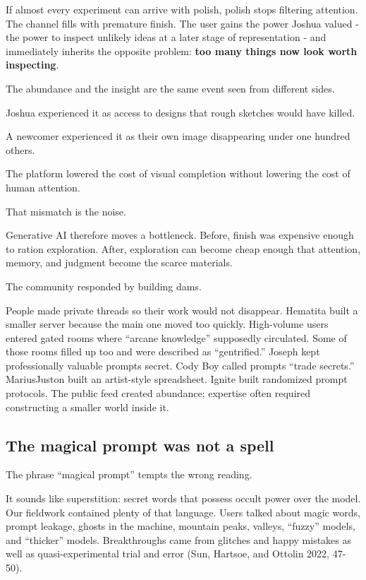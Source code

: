 \documentclass[
]{article}
\begin{document}
If almost every experiment can arrive with polish, polish stops
filtering attention. The channel fills with premature finish. The user
gains the power Joshua valued - the power to inspect unlikely ideas at a
later stage of representation - and immediately inherits the opposite
problem: \textbf{too many things now look worth inspecting}.

The abundance and the insight are the same event seen from different
sides.

Joshua experienced it as access to designs that rough sketches would
have killed.

A newcomer experienced it as their own image disappearing under one
hundred others.

The platform lowered the cost of visual completion without lowering the
cost of human attention.

That mismatch is the noise.

Generative AI therefore moves a bottleneck. Before, finish was expensive
enough to ration exploration. After, exploration can become cheap enough
that attention, memory, and judgment become the scarce materials.

The community responded by building dams.

People made private threads so their work would not disappear. Hematita
built a smaller server because the main one moved too quickly.
High-volume users entered gated rooms where ``arcane knowledge''
supposedly circulated. Some of those rooms filled up too and were
described as ``gentrified.'' Joseph kept professionally valuable prompts
secret. Cody Boy called prompts ``trade secrets.'' MariusJuston built an
artist-style spreadsheet. Ignite built randomized prompt protocols. The
public feed created abundance; expertise often required constructing a
smaller world inside it.

\subsection{The magical prompt was not a
spell}\label{the-magical-prompt-was-not-a-spell}

The phrase ``magical prompt'' tempts the wrong reading.

It sounds like superstition: secret words that possess occult power over
the model. Our fieldwork contained plenty of that language. Users talked
about magic words, prompt leakage, ghosts in the machine, mountain
peaks, valleys, ``fuzzy'' models, and ``thicker'' models. Breakthroughs
came from glitches and happy mistakes as well as quasi-experimental
trial and error (Sun, Hartsoe, and Ottolin 2022, 47-50).
\end{document}
